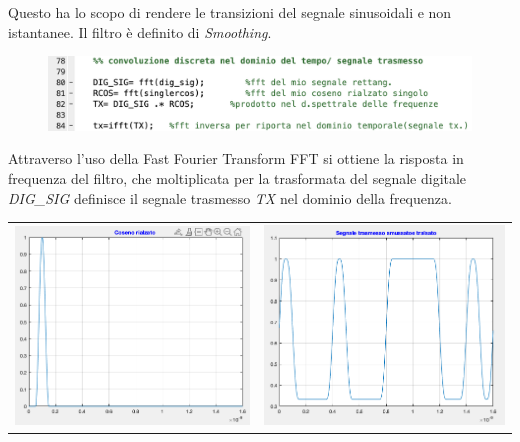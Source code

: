 \documentclass[12pt, a4paper]{article}
\begin{document}
Questo ha lo scopo di rendere le transizioni del segnale sinusoidali e non istantanee. 
Il filtro è definito di \textit{Smoothing}.

\begin{figure}[h!]
\centering
\includegraphics[scale=0.4]{convoluzionediscreta.png}
\caption{}
\label{}
\end{figure}

Attraverso l'uso della Fast Fourier Transform FFT si ottiene la risposta in frequenza del filtro, che moltiplicata per la trasformata del segnale digitale \textit{DIG\_SIG} definisce il segnale trasmesso \textit{TX} nel dominio della frequenza.

\vspace{5mm}
\begin{center}
\begin{tabular}{c c}
\includegraphics[scale = 0.7]{cosrialzatoimg.png}
&
\includegraphics[scale = 0.7]{segnalesmussato.png}
\end{tabular}
\end{center}


\end{document}
